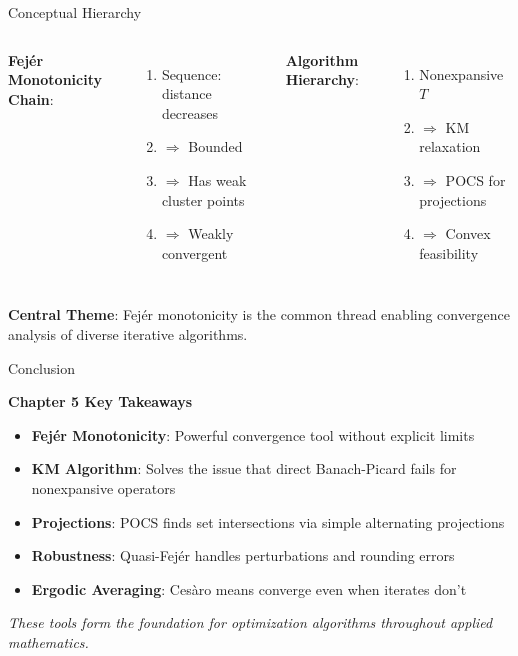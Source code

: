 \documentclass[aspectratio=169,10pt]{beamer}
\begin{document}
\begin{frame}{Conceptual Hierarchy}
    \begin{columns}[T]
        \textbf{Fejér Monotonicity Chain}:
        \begin{enumerate}
            \item Sequence: distance decreases
            \item $\Rightarrow$ Bounded
            \item $\Rightarrow$ Has weak cluster points
            \item $\Rightarrow$ Weakly convergent
        \end{enumerate}

        \textbf{Algorithm Hierarchy}:
        \begin{enumerate}
            \item Nonexpansive $T$
            \item $\Rightarrow$ KM relaxation
            \item $\Rightarrow$ POCS for projections
            \item $\Rightarrow$ Convex feasibility
        \end{enumerate}
    \end{columns}

    \vspace{0.5cm}

    \textbf{Central Theme}: Fejér monotonicity is the common thread enabling convergence analysis of diverse iterative algorithms.
\end{frame}

\begin{frame}{Conclusion}
    \begin{center}
        \LARGE
        \textbf{Chapter 5 Key Takeaways}
    \end{center}

    \vspace{1cm}

    \begin{itemize}
        \item \textbf{Fejér Monotonicity}: Powerful convergence tool without explicit limits
        
        \item \textbf{KM Algorithm}: Solves the issue that direct Banach-Picard fails for nonexpansive operators
        
        \item \textbf{Projections}: POCS finds set intersections via simple alternating projections
        
        \item \textbf{Robustness}: Quasi-Fejér handles perturbations and rounding errors
        
        \item \textbf{Ergodic Averaging}: Cesàro means converge even when iterates don't
    \end{itemize}

    \vspace{1cm}

    \textit{These tools form the foundation for optimization algorithms throughout applied mathematics.}
\end{frame}
\end{document}
